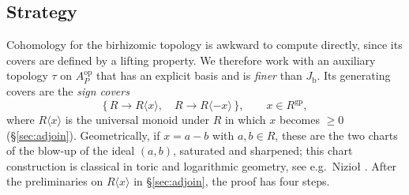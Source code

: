 \documentclass[11pt]{article}
\newcommand{\gp}{\mathrm{gp}}
\newcommand{\Jb}{J_{\mathrm b}}
\theoremstyle{definition}
\theoremstyle{remark}
\begin{document}
\subsection{Strategy}

Cohomology for the birhizomic topology is awkward to compute directly, since
its covers are defined by a lifting property.  We therefore work with an
auxiliary topology \(\tau\) on \(A_P^{\mathrm{op}}\) that has an explicit
basis and is \emph{finer} than \(\Jb\).  Its generating covers are the
\emph{sign covers}
\[
   \{\,R\to R\langle x\rangle,\quad R\to R\langle -x\rangle\,\},
   \qquad x\in R^{\gp},
\]
where \(R\langle x\rangle\) is the universal monoid under \(R\) in which
\(x\) becomes \(\ge0\) (\S\ref{sec:adjoin}).  Geometrically, if \(x=a-b\) with
\(a,b\in R\), these are the two charts of the blow-up of the ideal
\((a,b)\), saturated and sharpened; this chart construction is classical in
toric and logarithmic geometry, see e.g.\ Nizio{\l} \cite[\S4]{niziol}.
After the preliminaries on \(R\langle x\rangle\) in \S\ref{sec:adjoin},
the proof has four steps.
\end{document}
